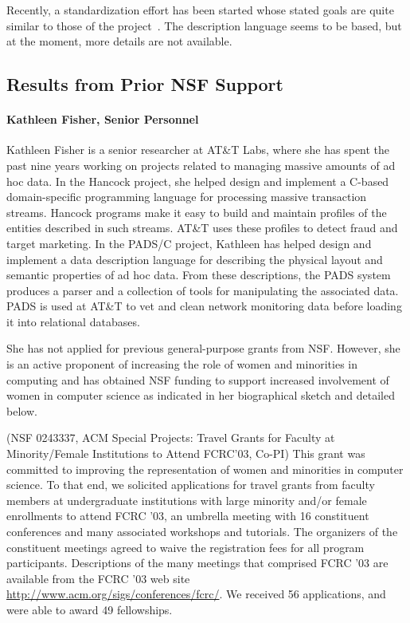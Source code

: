\documentclass[11pt]{article}
\begin{document}
Recently, a standardization effort has been started whose stated goals are quite similar to those of the \pads{} project~\cite{dfdl}. The description
language seems to be \xml{} based, but at the moment, more details are 
not available.

\subsection{Results from Prior NSF Support}
\label{sec:results}

\paragraph*{Kathleen Fisher, Senior Personnel} 
Kathleen Fisher is a senior researcher at AT\&T Labs,
where she has spent the past nine years working on projects
related to managing massive amounts of ad hoc data.
In the Hancock project, she helped design and implement a C-based
domain-specific programming language for processing massive  
transaction streams.  Hancock programs make it easy to build
and maintain profiles of the entities described in such streams. 
AT\&T uses these profiles to detect fraud and target marketing.
In the PADS/C project, Kathleen has helped design and implement
a data description language for describing the physical layout
and semantic properties of ad hoc data.  From these descriptions,
the PADS system produces a parser and a collection of tools for
manipulating the associated data.  PADS is used at AT&T to
vet and clean network monitoring data before loading it into
relational databases.  

She has not applied for previous general-purpose grants from NSF.
However, she is an active proponent of increasing the
role of women and minorities in computing and has
obtained NSF funding to support increased involvement of women
in computer science as indicated in her biographical sketch
and detailed below.

(NSF 0243337, ACM Special Projects: 
Travel Grants for Faculty at Minority/Female Institutions to Attend
FCRC'03, Co-PI) This grant was committed to improving the representation of women and
minorities in computer science. To that end, we solicited applications
for travel grants from faculty members at undergraduate institutions
with large minority and/or female enrollments to attend FCRC '03, an
umbrella meeting with 16 constituent conferences and many associated
workshops and tutorials.  The organizers of the constituent meetings agreed to waive
the registration fees for all program participants. 
Descriptions of the many meetings that
comprised FCRC '03 are available from the FCRC '03 web site 
\url{http://www.acm.org/sigs/conferences/fcrc/}.  We
received 56 applications, and were able to award 49
fellowships.
\end{document}
